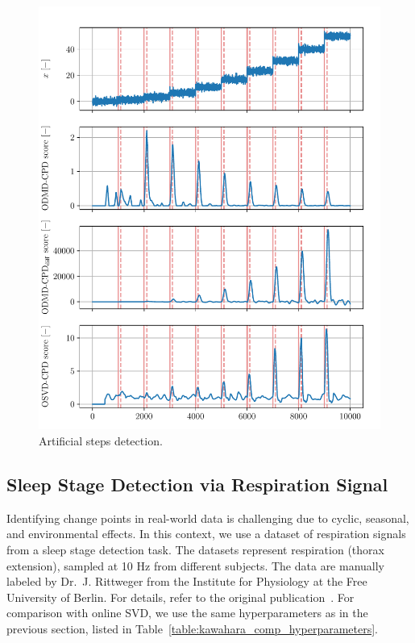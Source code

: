 \begin{figure}[H]
    \centering
    \includegraphics[width=\linewidth]{figures/y0-chd_r2_100_100-roll_301-dmd_w1.0-h80.pdf}
    \caption{Artificial steps detection.}\label{fig:artificial_steps_detection}
\end{figure}

\subsection{Sleep Stage Detection via Respiration Signal}
Identifying change points in real-world data is challenging due to cyclic, seasonal, and environmental effects. In this context, we use a dataset of respiration signals from a sleep stage detection task. The datasets represent respiration (thorax extension), sampled at 10 Hz from different subjects. The data are manually labeled by Dr.~J. Rittweger from the Institute for Physiology at the Free University of Berlin. For details, refer to the original publication~\citep{Keogh2005}. For comparison with online SVD, we use the same hyperparameters as in the previous section, listed in Table~\ref{table:kawahara_comp_hyperparameters}.


